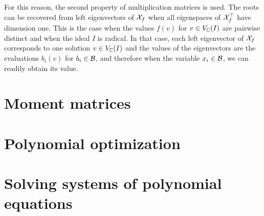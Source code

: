For this reason, the second property of multiplication matrices is used.
The roots can be recovered from left eigenvectors of $\mathcal{X}_f$ when all eigenspaces of $\mathcal{X}_f^\top$ have dimension one.
This is the case when the values $f(v)$ for $v\in V_{\mathbb{C}}(I)$ are pairwise distinct and when the ideal $I$ is radical.
In that case, each left eigenvector of $\mathcal{X}_f$ corresponds to one solution $v\in V_{\mathbb{C}}(I)$ and the values of the eigenvectors are the evaluations $b_i(v)$ for $b_i\in\mathcal{B}$, and therefore when the variable $x_i\in\mathcal{B}$, we can readily obtain its value.

\section{Moment matrices}

\section{Polynomial optimization}

\section{Solving systems of polynomial equations}
